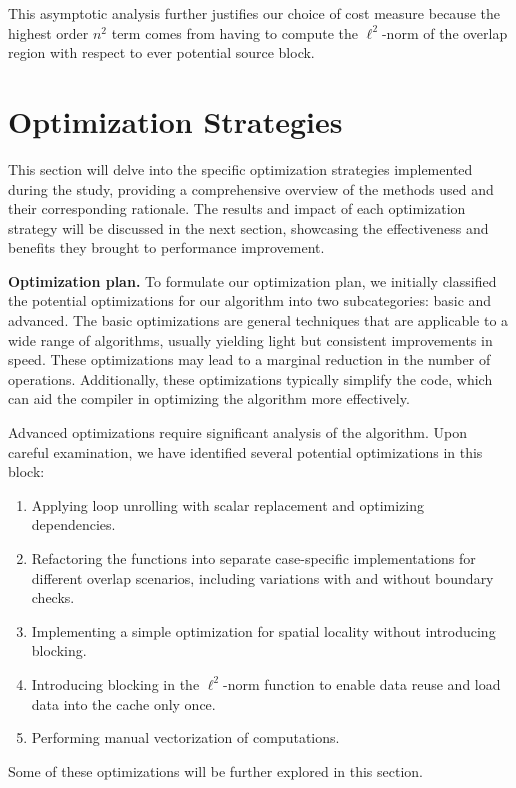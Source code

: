\documentclass[letterpaper]{article}
\newcommand{\mypar}[1]{{\bf #1.}}
\begin{document}
This asymptotic analysis further justifies our choice of cost measure because the highest order $n^2$ term comes from having to compute the $\ell ^2$-norm of the overlap region with respect to ever potential source block.

\section{Optimization Strategies}\label{sec:yourmethod}

 This section will delve into the specific optimization strategies implemented during the study, providing a comprehensive overview of the methods used and their corresponding rationale. The results and impact of each optimization strategy will be discussed in the next section, showcasing the effectiveness and benefits they brought to performance improvement.

\mypar{Optimization plan} 
To formulate our optimization plan, we initially classified the potential optimizations for our algorithm into two subcategories: basic and advanced. The basic optimizations are general techniques that are applicable to a wide range of algorithms, usually yielding light but consistent improvements in speed. These optimizations may lead to a marginal reduction in the number of operations. Additionally, these optimizations typically simplify the code, which can aid the compiler in optimizing the algorithm more effectively.

Advanced optimizations require significant analysis of the algorithm. Upon careful examination, we have identified several potential optimizations in this block:

\begin{enumerate}
\item Applying loop unrolling with scalar replacement and optimizing dependencies.
\item Refactoring the functions into separate case-specific implementations for different overlap scenarios, including variations with and without boundary checks.
\item Implementing a simple optimization for spatial locality without introducing blocking.
\item Introducing blocking in the $\ell ^2$-norm function to enable data reuse and load data into the cache only once.
\item Performing manual vectorization of computations.
\end{enumerate}

Some of these optimizations will be further explored in this section.
\end{document}

